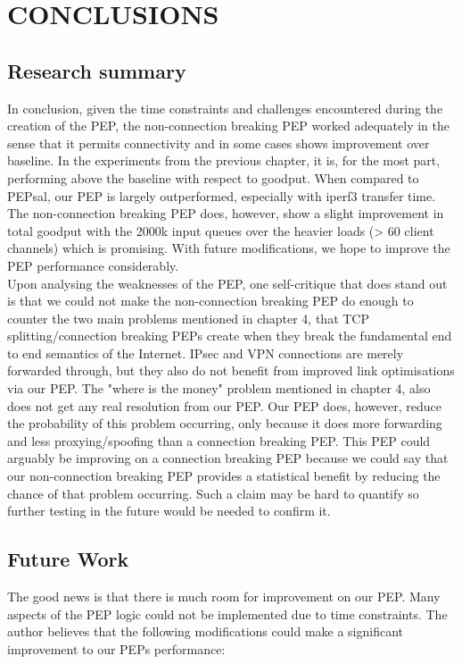 \chapter{CONCLUSIONS}

\section{Research summary}
In conclusion, given the time constraints and challenges encountered during the creation of the PEP, the non-connection breaking PEP worked adequately in the sense that it permits connectivity and in some cases shows improvement over baseline. In the experiments from the previous chapter, it is, for the most part, performing above the baseline with respect to goodput. When compared to PEPsal, our PEP is largely outperformed, especially with iperf3 transfer time. The non-connection breaking PEP does, however, show a slight improvement in total goodput with the 2000k input queues over the heavier loads (> 60 client channels) which is promising. With future modifications, we hope to improve the PEP performance considerably. \\

Upon analysing the weaknesses of the PEP, one self-critique that does stand out is that we could not make the non-connection breaking PEP do enough to counter the two main problems mentioned in chapter 4, that TCP splitting/connection breaking PEPs create when they break the fundamental end to end semantics of the Internet. IPsec and VPN connections are merely forwarded through, but they also do not benefit from improved link optimisations via our PEP. The "where is the money" problem mentioned in chapter 4, also does not get any real resolution from our PEP. Our PEP does, however, reduce the probability of this problem occurring, only because it does more forwarding and less proxying/spoofing than a connection breaking PEP. This PEP could arguably be improving on a connection breaking PEP because we could say that our non-connection breaking PEP provides a statistical benefit by reducing the chance of that problem occurring. Such a claim may be hard to quantify so further testing in the future would be needed to confirm it.

\section{Future Work}
The good news is that there is much room for improvement on our PEP. Many aspects of the PEP logic could not be implemented due to time constraints. The author believes that the following modifications could make a significant improvement to our PEPs performance:\\

